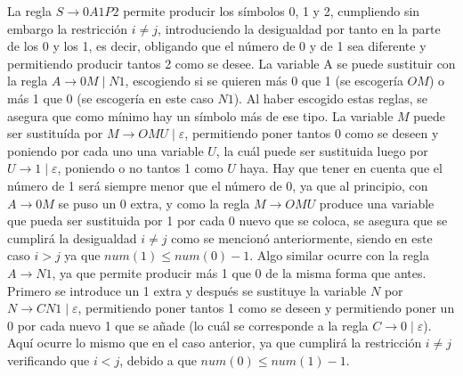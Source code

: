 \documentclass[11pt,a4paper]{article}
\begin{document}
		La regla $S \rightarrow 0A1P2$ permite producir los símbolos 0, 1 y 2, cumpliendo sin embargo la
		restricción $i \neq j$, introduciendo la desigualdad por tanto en la parte de los 0 y los 1, es decir,
		obligando que el número de 0 y de 1 sea diferente y permitiendo producir tantos 2 como se desee. La
		variable A se puede sustituir con la regla $A \rightarrow 0M \; | \; N1$, escogiendo si se quieren más 0
		que 1 (se escogería $OM$) o más 1 que 0 (se escogería en este caso $N1$). Al haber escogido estas reglas,
		se asegura que como mínimo hay un símbolo más de ese tipo. La variable $M$ puede ser sustituída por $M
		\rightarrow OMU \; | \; \varepsilon$, permitiendo poner tantos 0 como se deseen y poniendo por cada uno
		una variable $U$, la cuál puede ser sustituida luego por $U \rightarrow 1 \; | \; \varepsilon$, poniendo
		o no tantos 1 como 	$U$ haya. Hay que tener en cuenta que el número de 1 será siempre menor que
		el número de 0, ya que al principio, con $A \rightarrow 0M$ se puso un 0 extra, y como la regla $M
		\rightarrow OMU$ produce una variable que pueda ser sustituida por 1 por cada 0 nuevo que se coloca, se
		asegura que se cumplirá la	desigualdad $i \neq j$ como se mencionó anteriormente, siendo en este caso $i
		> j$ ya que $num(1) \leq num(0) - 1$. Algo similar ocurre con la regla $A \rightarrow N1$, ya que permite
		producir más 1 que 0 de la misma forma que antes. Primero se introduce un 1 extra y después se sustituye
		la variable $N$ por $N \rightarrow CN1 \; | \; \varepsilon$, permitiendo poner tantos 1 como se deseen y
		permitiendo poner un 0 por cada nuevo 1 que se añade (lo cuál se corresponde a la regla $C \rightarrow
		0 \; | \; \varepsilon$). Aquí ocurre lo mismo que en el caso anterior, ya que cumplirá la restricción $i
		\neq j$ verificando que $i < j$, debido a que $num(0) \leq num(1) - 1$. \par
		
\end{document}
